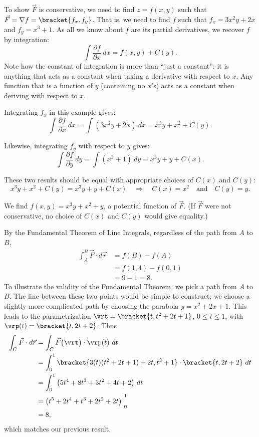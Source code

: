 {To show $\vec F$ is conservative, we need to find $z = f(x,y)$ such that $\vec F = \nabla f =\bracket{f_x, f_y}$. That is, we need to find $f$ such that $f_x = 3x^2y+2x$ and $f_y = x^3+1$. As all we know about $f$ are its partial derivatives, we recover $f$ by integration:
\[\int \frac{\partial f}{\partial x}\ dx = f(x,y) + C(y).\]
Note how the constant of integration is more than ``just a constant'': it is anything that acts as a constant when taking a derivative with respect to $x$. Any function that is a function of $y$ (containing no $x$'s) acts as a constant when deriving with respect to $x$.

Integrating $f_x$ in this example gives:
\[\int \frac{\partial f}{\partial x}\ dx = \int (3x^2y+2x)\ dx = x^3y+x^2 + C(y).\]

Likewise, integrating $f_y$ with respect to $y$ gives:
\[\int \frac{\partial f}{\partial y}\ dy = \int( x^3+1)\ dy = x^3y+ y + C(x).\]

These two results should be equal with appropriate choices of $C(x)$ and $C(y)$:
\[
x^3y+x^2 + C(y) = x^3y+ y + C(x)
\quad \Rightarrow\quad
C(x) = x^2 \quad \text{and}\quad C(y) = y.
\]

We find $f(x,y) = x^3y+x^2+y$, a potential function of $\vec F$. (If $\vec F$ were not conservative, no choice of $C(x)$ and $C(y)$ would give equality.)

By the Fundamental Theorem of Line Integrals, regardless of the path from $A$ to $B$, 
\begin{align*}
	\int_A^B\vec F\cdot d\vec r
	&= f(B) - f(A) \\
	&= f(1,4) - f(0,1) \\
	&= 9 - 1 = 8.
\end{align*}
To illustrate the validity of the Fundamental Theorem, we pick a path from $A$ to $B$. The line between these two points would be simple to construct; we choose a slightly more complicated path by choosing the parabola $y = x^2+2x+1$. This leads to the parametrization $\vrt =\bracket{t, t^2+2t+1}$, $0\leq t\leq 1$, with $\vrp(t) =\bracket{t, 2t+2}$. Thus
\begin{align*}
	\int_C \vec F\cdot d\vec r &= \int_C\vec F\big(\vrt\big)\cdot\vrp(t)\ dt\\
	&= \int_0^1\bracket{3(t)(t^2+2t+1)+2t, t^3+1}\cdot\bracket{t,2t+2}\ dt\\
	&= \int_0^1 \big(5t^4+8t^3+3t^2+4t+2\big)\ dt\\
	&= \big(t^5+2t^4+t^3+2t^2+2t\big)\Big|_0^1\\
	&= 8,
\end{align*}				
which matches our previous result.}


